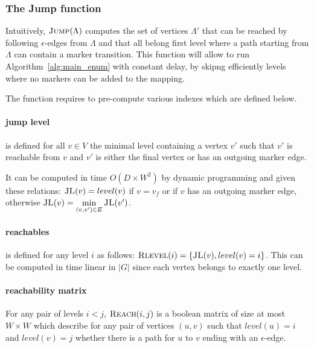 \documentclass[12px]{article}
\theoremstyle{definition}
\begin{document}
      \subsubsection{The Jump function}

        Intuitively, $\Call{Jump}{\Lambda}$ computes the set of vertices
        $\Lambda'$ that can be reached by following $\epsilon$-edges from
        $\Lambda$ and that all belong first level where a path starting from
        $\Lambda$ can contain a marker transition. This function will allow to
        run Algorithm~\ref{alg:main_enum} with constant delay, by skipng
        efficiently levels where no markers can be added to the mapping.

        The  function requires to pre-compute various indexes
        which are defined below.

        \paragraph{jump level}

           is defined for all $v \in V$ the minimal level
          containing a vertex $v'$ such that $v'$ is reachable from $v$ and
          $v'$ is either the final vertex or has an outgoing marker edge.

          It can be computed in time $O(D \times W^2)$ by dynamic programming
          and given these relations: $\Call{JL}{v} = level(v)$ if $v = v_f$ or
          if $v$ has an outgoing marker edge, otherwise $\Call{JL}{v} =
          \min\limits_{(v, v') \in E} \Call{JL}{v'}$.

        \paragraph{reachables}

           is defined for any level $i$ as follows:
          $\Call{Rlevel}{i} = \{\Call{JL}{v}, level(v) = i\}$. This can be
          computed in time linear in $|G|$ since each vertex belongs to exactly
          one level.

        \paragraph{reachability matrix}

          For any pair of levels $i < j$, $\Call{Reach}{i,j}$ is a boolean
          matrix of size at most $W \times W$ which describe for any pair of
          vertices $(u, v)$ such that $level(u) = i$ and $level(v) = j$ whether
          there is a path for $u$ to $v$ ending with an $\epsilon$-edge.
\end{document}
